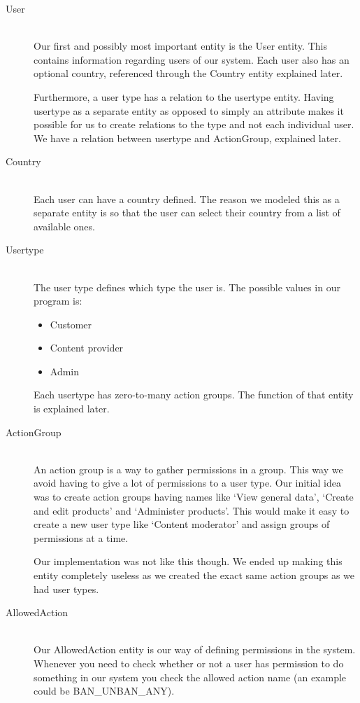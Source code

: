 \begin{description}
\item[User] \hfill \\
Our first and possibly most important entity is the User entity. This contains information regarding users of our system. Each user also has an optional country, referenced through the Country entity explained later.

Furthermore, a user type has a relation to the usertype entity. Having usertype as a separate entity as opposed to simply an attribute makes it possible for us to create relations to the type and not each individual user. We have a relation between usertype and ActionGroup, explained later.

\item[Country] \hfill \\
Each user can have a country defined. The reason we modeled this as a separate entity is so that the user can select their country from a list of available ones.

\item[Usertype] \hfill \\
The user type defines which type the user is. The possible values in our program is:
\begin{itemize}
	\item Customer
	\item Content provider
	\item Admin
\end{itemize}

Each usertype has zero-to-many action groups. The function of that entity is explained later.

\item[ActionGroup] \hfill \\
An action group is a way to gather permissions in a group. This way we avoid having to give a lot of permissions to a user type. Our initial idea was to create action groups having names like `View general data', `Create and edit products' and `Administer products'. This would make it easy to create a new user type like `Content moderator' and assign groups of permissions at a time.

Our implementation was not like this though. We ended up making this entity completely useless as we created the exact same action groups as we had user types.

\item[AllowedAction] \hfill \\
Our AllowedAction entity is our way of defining permissions in the system. Whenever you need to check whether or not a user has permission to do something in our system you check the allowed action name (an example could be BAN\_UNBAN\_ANY).


\end{description}
